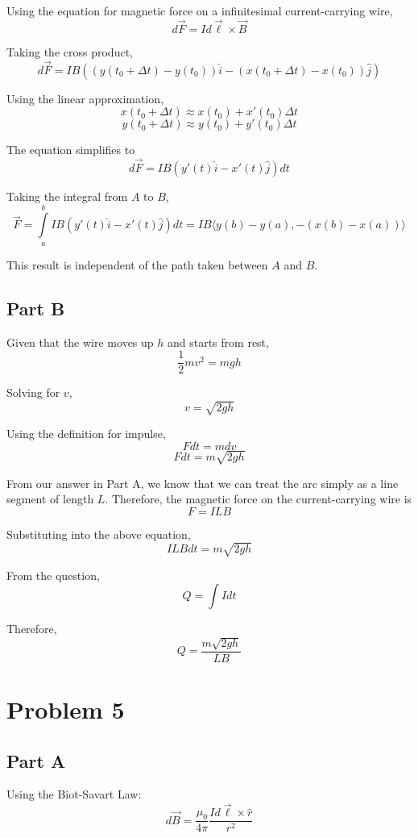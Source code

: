 \documentclass{article}
\begin{document}
Using the equation for magnetic force on a infinitesimal current-carrying wire,
$$ d\vec{F} = I d\vec{\ell} \times \vec{B} $$

Taking the cross product,
$$ d\vec{F} = I B \left( \left( y(t_{0} + \Delta t) - y(t_{0}) \right) \hat{i} -
\left( x(t_{0} + \Delta t) - x(t_{0})\right) \hat{j} \right)$$

Using the linear approximation,
$$ x(t_{0} + \Delta t) \approx x(t_{0}) + x'(t_{0}) \Delta t $$
$$ y(t_{0} + \Delta t) \approx y(t_{0}) + y'(t_{0}) \Delta t $$

The equation simplifies to
$$ d\vec{F} = I B (y'(t) \hat{i} - x'(t) \hat{j}) dt $$

Taking the integral from $A$ to $B$,
$$ \vec{F} = \int\limits_{a}^{b} I B (y'(t) \hat{i} - x'(t) \hat{j}) dt = I B
\big\langle y(b) - y(a), -(x(b) - x(a)) \big\rangle$$

This result is independent of the path taken between $A$ and $B$.

\subsection*{Part B}

Given that the wire moves up $h$ and starts from rest,
$$ \frac{ 1 }{ 2 } m v^{2} = mgh $$

Solving for $v$,
$$ v = \sqrt{2 g h} $$

Using the definition for impulse,
$$ F dt = m dv $$
$$ F dt = m \sqrt{2 g h} $$

From our answer in Part A, we know that we can treat the arc simply as a line
segment of length $L$. Therefore, the magnetic force on the current-carrying wire is
$$ F = I L B $$

Substituting into the above equation,
$$ I L B dt = m \sqrt{2 g h} $$

From the question,
$$ Q = \int I dt $$

Therefore,
$$ Q = \frac{ m \sqrt{2 g h} }{ L B } $$

\section*{Problem 5}

\subsection*{Part A}

Using the Biot-Savart Law:
$$ d\vec{B} = \frac{ \mu_{0} }{ 4 \pi } \frac{ I d\vec{\ell} \times \hat{r} }{
r^{2} } $$
\end{document}
